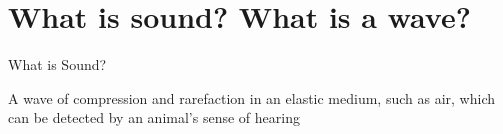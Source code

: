 \part{What is sound? What is a wave?}
\frame{\partpage}

\begin{frame}{What is Sound?}
	\begin{center}
		 A wave of compression and rarefaction in an elastic medium, such as air, which can be detected by an animal’s sense of hearing 
	\end{center}
\end{frame}



